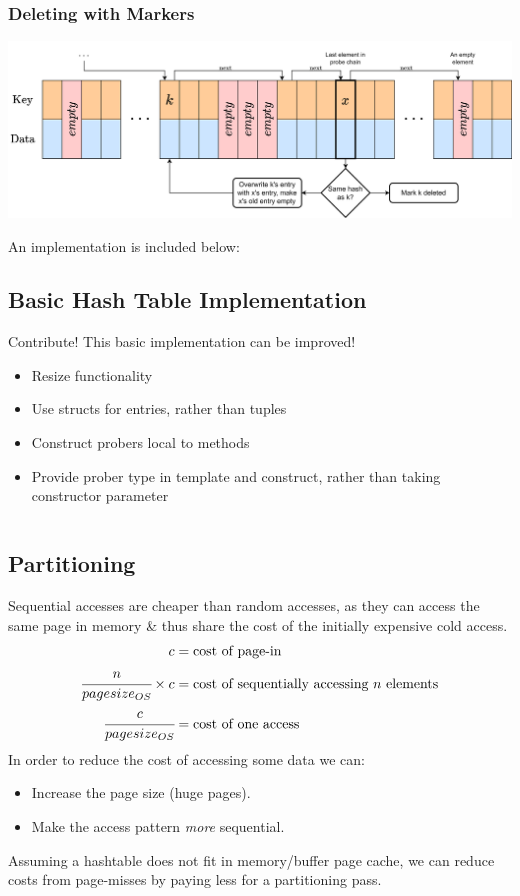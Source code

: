 \subsubsection{Deleting with Markers}
\begin{center}
    \includegraphics[width=.8\textwidth]{algorithms_and_indices/images/mark_deletion.drawio.png}
\end{center}
An implementation is included below:
\subsection{Basic Hash Table Implementation}
\begin{sidenotebox}{Contribute!}
    This basic implementation can be improved!
    \begin{itemize}
        \item Resize functionality
        \item Use structs for entries, rather than tuples
        \item Construct probers local to methods
        \item Provide prober type in template and construct, rather than taking constructor parameter
    \end{itemize}
\end{sidenotebox}

\inputminted{cpp}{algorithms_and_indices/code/hashtable.cc}

\subsection{Partitioning}
Sequential accesses are cheaper than random accesses, as they can access the same page in memory \& thus share the cost of the initially expensive cold access.
\[\begin{split}
        c &= \text{cost of page-in } \\
        \cfrac{n}{pagesize_{OS}} \times c  &= \text{cost of sequentially accessing }n \text{ elements}\\
        \cfrac{c}{pagesize_{OS}} &= \text{cost of one access} \\
    \end{split}\]
In order to reduce the cost of accessing some data we can:
\begin{itemize}
    \item Increase the page size (huge pages).
    \item Make the access pattern \textit{more} sequential.
\end{itemize}
Assuming a hashtable does not fit in memory/buffer page cache, we can reduce costs from page-misses by paying less for a partitioning pass.

